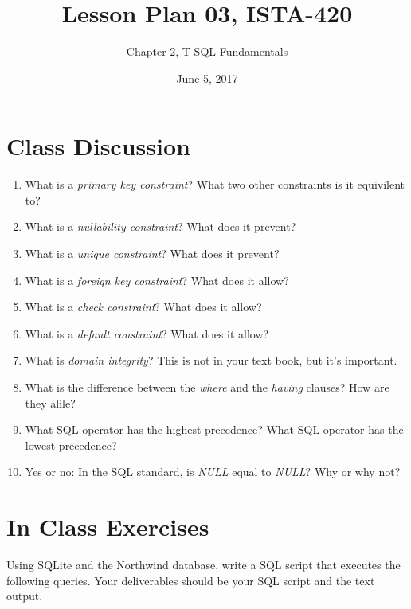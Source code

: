 \documentclass{article}
\title{Lesson Plan 03, ISTA-420}
\author{Chapter 2, T-SQL Fundamentals}
\date{June 5, 2017}
\begin{document}
    

    \maketitle{}

    \section{Class Discussion}

    \begin{enumerate}

        \item What is a \textit{primary key constraint}? What two other constraints is it equivilent to?
        \item What is a \textit{nullability constraint}? What does it prevent?
        \item What is a \textit{unique constraint}? What does it prevent?
        \item What is a \textit{foreign key constraint}? What does it allow?
        \item What is a \textit{check constraint}? What does it allow?
        \item What is a \textit{default constraint}? What does it allow?
        \item What is \textit{domain integrity}? This is not in your text book, but it's important.
        \item What is the difference between the \textit{where} and the \textit{having} clauses? How are they alile?
        \item What SQL operator has the highest precedence? What SQL operator has the lowest precedence?
        \item Yes or no: In the SQL standard, is \textit{NULL} equal to  \textit{NULL}? Why or why not?



    \end{enumerate}


    \section{In Class Exercises}

Using SQLite and the Northwind database, write a SQL script that executes the following queries. Your deliverables should be your SQL script and the text output.
\end{document}
